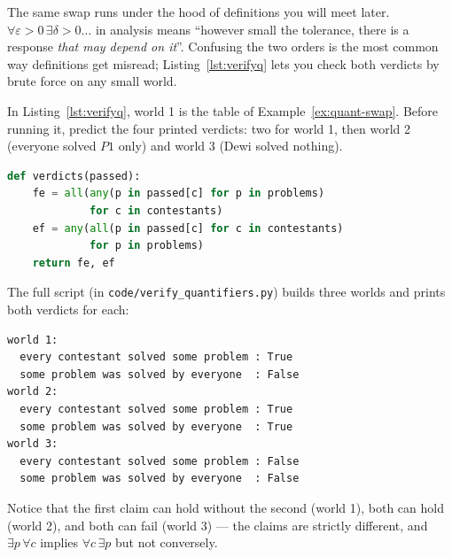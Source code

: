 The same swap runs under the hood of definitions you will meet later.
$\forall \varepsilon>0\,\exists \delta>0 \dots$ in analysis means ``however small the
tolerance, there is a response \emph{that may depend on it}''. Confusing the two
orders is the most common way definitions get misread; Listing~\ref{lst:verifyq}
lets you check both verdicts by brute force on any small world.

\begin{checkpoint}
In Listing~\ref{lst:verifyq}, world 1 is the table of
Example~\ref{ex:quant-swap}. Before running it, predict the four printed verdicts:
two for world 1, then world 2 (everyone solved $P1$ only) and world 3 (Dewi solved
nothing).
\end{checkpoint}

\begin{lstlisting}[language=Python,caption={\texttt{verify\_quantifiers.py}: checking
$\forall\exists$ vs $\exists\forall$ by brute force on finite worlds.},
label={lst:verifyq}]
def verdicts(passed):
    fe = all(any(p in passed[c] for p in problems)
             for c in contestants)
    ef = any(all(p in passed[c] for c in contestants)
             for p in problems)
    return fe, ef
\end{lstlisting}
The full script (in \texttt{code/verify\_quantifiers.py}) builds three worlds and
prints both verdicts for each:
\begin{lstlisting}[numbers=none]
world 1:
  every contestant solved some problem : True
  some problem was solved by everyone  : False
world 2:
  every contestant solved some problem : True
  some problem was solved by everyone  : True
world 3:
  every contestant solved some problem : False
  some problem was solved by everyone  : False
\end{lstlisting}
Notice that the first claim can hold without the second (world 1), both can hold
(world 2), and both can fail (world 3) --- the claims are strictly different, and
$\exists p\,\forall c$ implies $\forall c\,\exists p$ but not conversely.

